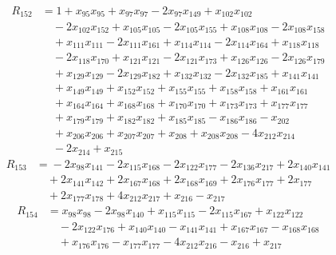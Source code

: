 \begin{align*}
R_{152}&={}1 +x_{95}x_{95} +x_{97}x_{97} -2x_{97}x_{149} +x_{102}x_{102}\\
&\quad{}-2x_{102}x_{152} +x_{105}x_{105} -2x_{105}x_{155} +x_{108}x_{108} -2x_{108}x_{158}\\
&\quad{}+x_{111}x_{111} -2x_{111}x_{161} +x_{114}x_{114} -2x_{114}x_{164} +x_{118}x_{118}\\
&\quad{}-2x_{118}x_{170} +x_{121}x_{121} -2x_{121}x_{173} +x_{126}x_{126} -2x_{126}x_{179}\\
&\quad{}+x_{129}x_{129} -2x_{129}x_{182} +x_{132}x_{132} -2x_{132}x_{185} +x_{141}x_{141}\\
&\quad{}+x_{149}x_{149} +x_{152}x_{152} +x_{155}x_{155} +x_{158}x_{158} +x_{161}x_{161}\\
&\quad{}+x_{164}x_{164} +x_{168}x_{168} +x_{170}x_{170} +x_{173}x_{173} +x_{177}x_{177}\\
&\quad{}+x_{179}x_{179} +x_{182}x_{182} +x_{185}x_{185} -x_{186}x_{186} -x_{202}\\
&\quad{}+x_{206}x_{206} +x_{207}x_{207} +x_{208} +x_{208}x_{208} -4x_{212}x_{214}\\
&\quad{}-2x_{214} +x_{215}
\end{align*}
\begin{align*}
R_{153}&={}-2x_{98}x_{141} -2x_{115}x_{168} -2x_{122}x_{177} -2x_{136}x_{217} +2x_{140}x_{141}\\
&\quad{}+2x_{141}x_{142} +2x_{167}x_{168} +2x_{168}x_{169} +2x_{176}x_{177} +2x_{177}\\
&\quad{}+2x_{177}x_{178} +4x_{212}x_{217} +x_{216} -x_{217}
\end{align*}
\begin{align*}
R_{154}&={}x_{98}x_{98} -2x_{98}x_{140} +x_{115}x_{115} -2x_{115}x_{167} +x_{122}x_{122}\\
&\quad{}-2x_{122}x_{176} +x_{140}x_{140} -x_{141}x_{141} +x_{167}x_{167} -x_{168}x_{168}\\
&\quad{}+x_{176}x_{176} -x_{177}x_{177} -4x_{212}x_{216} -x_{216} +x_{217}
\end{align*}
\endgroup

